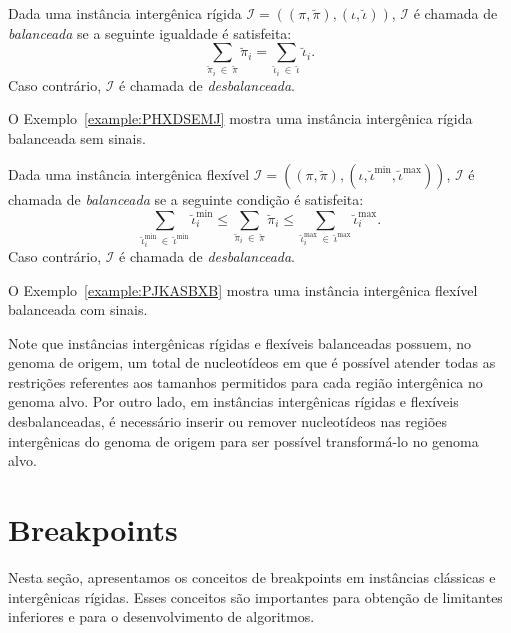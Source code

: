 

\begin{definition}
  Dada uma instância intergênica rígida $\mathcal{I} = ((\pi,\breve\pi),(\iota,\breve\iota))$, $\mathcal{I}$ é chamada de \emph{balanceada} se a seguinte igualdade é satisfeita: 
  $$\sum_{\breve\pi_i~\in~\breve\pi}\breve\pi_i = \sum_{\breve\iota_i~\in~\breve\iota}\breve\iota_i.$$
  Caso contrário, $\mathcal{I}$ é chamada de \emph{desbalanceada}.
\end{definition}

O Exemplo~\ref{example:PHXDSEMJ} mostra uma instância intergênica rígida balanceada sem sinais.



\begin{definition}
  Dada uma instância intergênica flexível $\mathcal{I} = ((\pi,\breve\pi),(\iota,\breve\iota^{\min},\breve\iota^{\max}))$, $\mathcal{I}$ é chamada de \emph{balanceada} se a seguinte condição é satisfeita: 
  $$\sum_{\breve\iota^{\min}_i~\in~\breve\iota^{\min}} \breve\iota^{\min}_i \le \sum_{\breve\pi_i~\in~\breve\pi} \breve\pi_i \le \sum_{\breve\iota^{\max}_i~\in~\breve\iota^{\max}}{\breve\iota^{\max}_i}.$$
  Caso contrário, $\mathcal{I}$ é chamada de \emph{desbalanceada}.
\end{definition}

O Exemplo~\ref{example:PJKASBXB} mostra uma instância intergênica flexível balanceada com sinais.



Note que instâncias intergênicas rígidas e flexíveis balanceadas possuem, no genoma de origem, um total de nucleotídeos em que é possível atender todas as restrições referentes aos tamanhos permitidos para cada região intergênica no genoma alvo. Por outro lado, em instâncias intergênicas rígidas e flexíveis desbalanceadas, é necessário inserir ou remover nucleotídeos nas regiões intergênicas do genoma de origem para ser possível transformá-lo no genoma alvo.

\section{Breakpoints}

Nesta seção, apresentamos os conceitos de breakpoints em instâncias clássicas e intergênicas rígidas. Esses conceitos são importantes para obtenção de limitantes inferiores e para o desenvolvimento de algoritmos.

